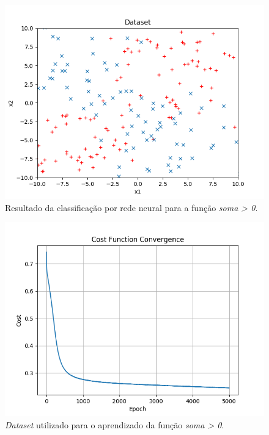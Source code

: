 \documentclass[conference]{IEEEtran}
\begin{document}
\begin{figure}[htbp]
\centering
\centerline{\includegraphics[scale=0.5]{imagens/xor/lambda_zero/dataset_xor.png}}
\caption{Resultado da classificação por rede neural para a função \textit{soma > 0}.}
\label{xor/lambda_zero/dataset_xor}
\end{figure} 

\begin{figure}[htbp]
\centering
\centerline{\includegraphics[scale=0.5]{imagens/xor/lambda_zero/convergence_xor.png}}
\caption{\textit{Dataset} utilizado para o aprendizado da função \textit{soma > 0}.}
\label{xor/lambda_zero/convergence_xor}
\end{figure}
\end{document}
